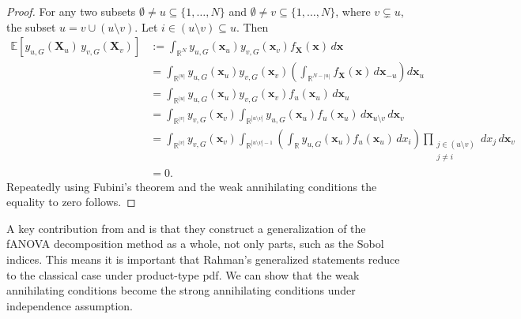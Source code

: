 \begin{proof}
For any two subsets $\emptyset \ne u \subseteq \{1,\dots,N\}$ and $\emptyset \ne v \subseteq \{1,\dots,N\}$, where $v \subsetneq u$, the subset $u = v \cup (u \setminus v)$. Let $i \in (u \setminus v) \subseteq u$. Then
\begin{align*}
\mathbb{E}[y_{u,G}(\mathbf{X}_u) \, y_{v,G}(\mathbf{X}_v)]
&:= \int_{\mathbb{R}^N} y_{u,G}(\mathbf{x}_u) y_{v,G}(\mathbf{x}_v) f_{\mathbf{X}}(\mathbf{x}) \, d\mathbf{x} \\
&= \int_{\mathbb{R}^{|u|}} y_{u,G}(\mathbf{x}_u) y_{v,G}(\mathbf{x}_v) \left( \int_{\mathbb{R}^{N - |u|}} f_{\mathbf{X}}(\mathbf{x}) \, d\mathbf{x}_{-u} \right) d\mathbf{x}_u \\
&= \int_{\mathbb{R}^{|u|}} y_{u,G}(\mathbf{x}_u) y_{v,G}(\mathbf{x}_v) f_u(\mathbf{x}_u) \, d\mathbf{x}_u \\
&= \int_{\mathbb{R}^{|v|}} y_{v,G}(\mathbf{x}_v)
    \int_{\mathbb{R}^{|u \setminus v|}} y_{u,G}(\mathbf{x}_u) f_u(\mathbf{x}_u) \, d\mathbf{x}_{u \setminus v} \, d\mathbf{x}_v \\
&= \int_{\mathbb{R}^{|v|}} y_{v,G}(\mathbf{x}_v)
    \int_{\mathbb{R}^{|u \setminus v| - 1}} \left( \int_{\mathbb{R}} y_{u,G}(\mathbf{x}_u) f_u(\mathbf{x}_u) \, dx_i \right)
    \prod_{\substack{j \in (u \setminus v) \\ j \ne i}} dx_j \, d\mathbf{x}_v \\
&= 0.
\end{align*}
Repeatedly using Fubini's theorem and the weak annihilating conditions the equality to zero follows.
\end{proof}

A key contribution from \cite{hooker2007} and \cite{rahman2014} is that they construct a generalization of the fANOVA decomposition method as a whole, not only parts, such as the Sobol indices.
This means it is important that Rahman's generalized statements reduce to the classical case under product-type pdf. We can show that the weak annihilating conditions become the strong annihilating conditions under independence assumption.

